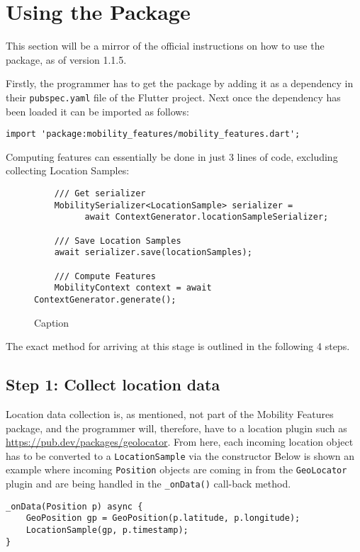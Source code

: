 \section{Using the Package}
This section will be a mirror of the official instructions on how to use the package, as of version 1.1.5.

Firstly, the programmer has to get the package by adding it as a dependency in their \verb|pubspec.yaml| file of the Flutter project. Next once the dependency has been loaded it can be imported as follows:

\begin{verbatim}
import 'package:mobility_features/mobility_features.dart';
\end{verbatim}

Computing features can essentially be done in just 3 lines of code, excluding collecting Location Samples:

\begin{figure}
    \centering
    \begin{verbatim}
    /// Get serializer
    MobilitySerializer<LocationSample> serializer =
          await ContextGenerator.locationSampleSerializer;
    
    /// Save Location Samples      
    await serializer.save(locationSamples);
    
    /// Compute Features
    MobilityContext context = await ContextGenerator.generate();
    \end{verbatim}
    \caption{Caption}
    \label{fig:my_label}
\end{figure}

The exact method for arriving at this stage is outlined in the following 4 steps.

\subsection*{Step 1: Collect location data}
Location data collection is, as mentioned, not part of the Mobility Features package, and the programmer will, therefore, have to a location plugin such as \url{https://pub.dev/packages/geolocator}. From here, each incoming location object has to be converted to a \verb|LocationSample| via the constructor
Below is shown an example where incoming \verb|Position| objects are coming in from the \verb|GeoLocator| plugin and are being handled in the \verb|_onData()| call-back method.

\begin{verbatim}
_onData(Position p) async {
    GeoPosition gp = GeoPosition(p.latitude, p.longitude);
    LocationSample(gp, p.timestamp);
}
\end{verbatim}

